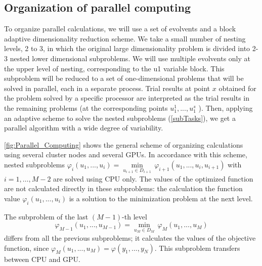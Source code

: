 \documentclass{svproc}
\begin{document}
\subsection{Organization of parallel computing}

To organize parallel calculations, we will use a set of evolvents and a block adaptive dimensionality reduction scheme. We take a small number of nesting levels, 2 to 3, in which the original large dimensionality problem is divided into 2-3 nested lower dimensional subproblems. We will use multiple evolvents only at the upper level of nesting, corresponding to the u1 variable block. This subproblem will be reduced to a set of one-dimensional problems that will be solved in parallel, each in a separate process. Trial results at point $x$ obtained for the problem solved by a specific processor are interpreted as the trial results in the remaining problems (at the corresponding points \(u^1_1,..., u^s_1\) ).
Then, applying an adaptive scheme to solve the nested subproblems (\ref{subTasks}), we get a parallel algorithm with a wide degree of variability.

\ref{fig:Parallel_Computing} shows the general scheme of organizing calculations using several cluster nodes and several GPUs. In accordance with this scheme, nested subproblems  ${{\varphi }_{i}}({{u}_{1}},...,{{u}_{i}})=\underset{{{u}_{i+1}}\in {{D}_{i+1}}}{\mathop{\min }}\,{{\varphi }_{i+1}}({{u}_{1}},...,{{u}_{i}},{{u}_{i+1}})$  with \(i=1,\ldots ,M-2\) are solved using CPU only. The values of the optimized function are not calculated directly in these subproblems: the calculation the function value  ${{\varphi }_{i}}({{u}_{1}},...,{{u}_{i}})$ is a solution to the minimization problem at the next level.

The subproblem of the last \((M - 1)\)-th level 
\[
{{\varphi }_{M-1}}({{u}_{1}},...,{{u}_{M-1}})=\underset{{{u}_{M}}\in {{D}_{M}}}{\mathop{\min }}\,{{\varphi }_{M}}({{u}_{1}},...,{{u}_{M}})
\]
 differs from all the previous subproblems; it calculates the values of the objective function, since ${{\varphi }_{M}}({{u}_{1}},...,{{u}_{M}})=\varphi ({{y}_{1}},...,{{y}_{N}})$. This subproblem transfers between CPU and GPU.
\end{document}
